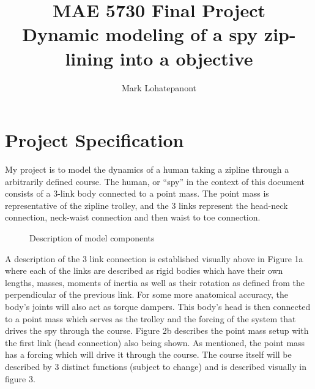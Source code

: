 \documentclass{article}
\title{MAE 5730 Final Project \\
\large{Dynamic modeling of a spy zip-lining into a objective}}
\author{Mark Lohatepanont}
\begin{document}
\maketitle
\newpage

\section{Project Specification}
My project is to model the dynamics of a human taking a zipline through a arbitrarily defined course. The human, or “spy” in the context of this document consists of a 3-link body connected to a point mass. The point mass is representative of the zipline trolley, and the 3 links represent the head-neck connection, neck-waist connection and then waist to toe connection. \\

        
\begin{figure}[h]
    \centering
	\qquad
	\caption{Description of model components}%
	\label{fig:example}%
\end{figure}

A description of the 3 link connection is established visually above in Figure 1a where each of the links are described as rigid bodies which have their own lengths, masses, moments of inertia as well as their rotation as defined from the perpendicular of the previous link. For some more anatomical accuracy, the body’s joints will also act as torque dampers. 
This body’s head is then connected to a point mass which serves as the trolley and the forcing of the system that drives the spy through the course. 
Figure 2b describes the point mass setup with the first link (head connection) also being shown. As mentioned, the point mass has a forcing which will drive it through the course.
The course itself will be described by 3 distinct functions (subject to change) and is described visually in figure 3.
\end{document}
